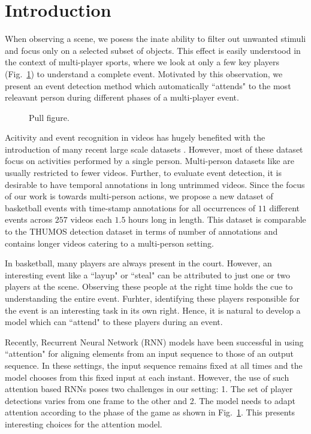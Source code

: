 
\section{Introduction}
When observing a scene, we posess the inate ability to filter out unwanted
stimuli \cite{Desimone_ARN95} and focus only on a selected subset of objects.
This effect is easily understood in the context of multi-player sports, where
we look at only a few key players (Fig.~\ref{fig:pull_figure}) to understand a
complete event. Motivated by this observation, we present an event detection
method which automatically ``attends" to the most releavant person during
different phases of a multi-player event.

\begin{figure}[ht!]
\begin{center}
\fbox{\rule{0pt}{2in} \rule{.9\linewidth}{0pt}}
\end{center}
   \caption{Pull figure.}
\label{fig:pull_figure}
\end{figure}

Acitivity and event recognition in videos has hugely benefited with the
introduction of many recent large scale datasets \cite{}. However, most of
these dataset focus on activities performed by a single person.  Multi-person
datasets like \cite{} are usually restricted to fewer videos.  Further, to
evaluate event detection, it is desirable to have temporal annotations in long
untrimmed videos. Since the focus of our work is towards multi-person actions,
we propose a new dataset of basketball events with time-stamp annotations for
all occurrences of $11$ different events across $257$ videos each $1.5$ hours
long in length.  This dataset is comparable to the THUMOS \cite{THUMOS}
detection dataset in terms of number of annotations and contains longer videos
catering to a multi-person setting.

In basketball, many players are always present in the court.
However, an interesting event like a ``layup" or ``steal" can be attributed
to just one or two players at the scene. Observing these people at the right
time holds the cue to understanding the entire event. Furhter, identifying
these players responsible for the event is an interesting task in its own right.
Hence, it is natural to develop a model which can ``attend" to these players during
an event.

Recently, Recurrent Neural Network (RNN) models have been successful in
using ``attention" \cite{Bahdnau_arxiv14,Xu_arxiv15,Yao_arxiv15} for aligning
elements from an input sequence to those of an output sequence. In these settings,
the input sequence remains fixed at all times and the model chooses from this
fixed input at each instant. However, the use of such attention based RNNs
poses two challenges in our setting:
1. The set of player detections varies from one frame to the other and
2. The model needs to adapt attention according to the phase of the game as
shown in Fig.~\ref{fig:pull_figure}. This presents interesting choices
for the attention model.

